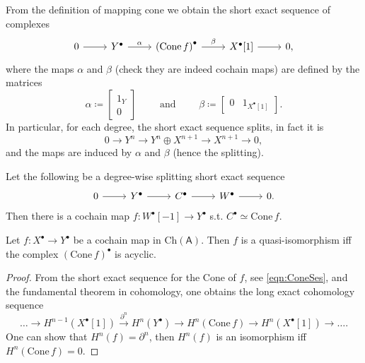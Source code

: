 \begin{rem}[]
	From the definition of mapping cone we obtain the short exact sequence of complexes
	\begin{equation}\label{eqn:ConeSes}
	\begin{tikzcd}
		0 \arrow[r, "", rightarrow] &
		Y^\bullet \arrow[r, "\alpha", rightarrow] &
		\left( \mathrm{Cone}\, f \right)^\bullet \arrow[r, "\beta", rightarrow] &
		X^\bullet[1] \arrow[r, "", rightarrow] &
		0
	,\end{tikzcd}
	\end{equation}
	where the maps $\alpha$ and $\beta$ (check they are indeed cochain maps) are defined by the matrices
	\begin{equation}
	\alpha \coloneqq 
	\begin{bmatrix}
		1_Y \\ 0
	\end{bmatrix} \qquad \text{ and } \qquad
	\beta \coloneqq 
	\begin{bmatrix}
		0 & 1_{X^\bullet[1]}
	\end{bmatrix} 
	.\end{equation} 
	In particular, for each degree, the short exact sequence splits, in fact it is
	\begin{equation}
	0 \to Y^n \to Y^n \oplus X^{n+1} \to X^{n+1} \to 0
	,\end{equation} 
	and the maps are induced by $\alpha$ and $\beta$ (hence the splitting).
\end{rem}

\begin{lem}
	Let the following be a degree-wise splitting short exact sequence
	\begin{equation*}
	\begin{tikzcd}
		0 \arrow[r, "", rightarrow] &
		Y^\bullet \arrow[r, "", rightarrow] &
		C^\bullet \arrow[r, "", rightarrow] &
		W^\bullet \arrow[r, "", rightarrow] &
		0
	.\end{tikzcd}
	\end{equation*}
	Then there is a cochain map $f\colon W^\bullet[-1] \to Y^\bullet$ s.t.
	$C^\bullet \simeq \mathrm{Cone}\, f$.
\end{lem} 

\begin{lem}
	Let $f\colon X^\bullet \to Y^\bullet$ be a cochain map in $\mathrm{Ch}(\mathsf{A})$.
	Then $f$ is a quasi-isomorphism iff the complex
	$(\mathrm{Cone}\, f)^\bullet$ is acyclic.
\end{lem} 
\begin{proof}
	From the short exact sequence for the Cone of $f$, see \eqref{eqn:ConeSes}, and the 
	fundamental theorem in cohomology, one obtains the long exact cohomology sequence
	\begin{equation}
		\ldots \to H^{n-1}(X^\bullet[1]) \xrightarrow{\partial^n} H^n(Y^\bullet) \to
		H^n(\mathrm{Cone}\, f) \to H^n(X^\bullet[1]) \to \ldots
	.\end{equation} 
	One can show that $H^n(f) = \partial^n$, then
	$H^n(f)$ is an isomorphism iff $H^n(\mathrm{Cone}\, f) = 0$.
\end{proof}

